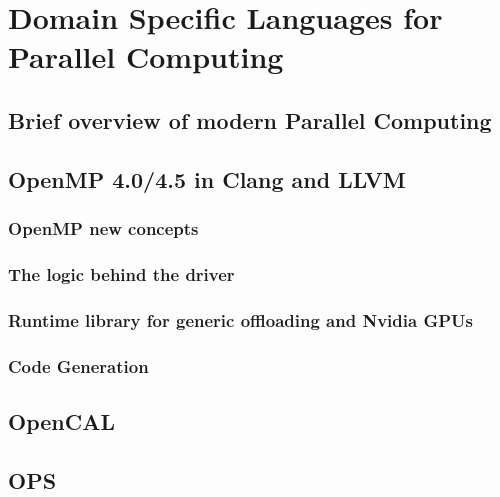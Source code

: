 \chapter{Domain Specific Languages for Parallel Computing}

\section{Brief overview of modern Parallel Computing}

\section{OpenMP 4.0/4.5 in Clang and LLVM}


\subsection{OpenMP new concepts}

\subsection{The logic behind the driver}

\subsection{Runtime library for generic offloading and Nvidia GPUs}

\subsection{Code Generation}


\section{OpenCAL}

\section{OPS}